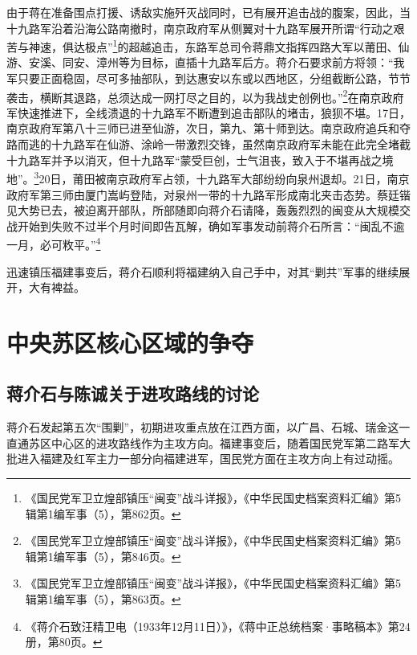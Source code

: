 由于蒋在准备围点打援、诱敌实施歼灭战同时，已有展开追击战的腹案，因此，当十九路军沿着沿海公路南撤时，南京政府军从侧翼对十九路军展开所谓“行动之艰苦与神速，俱达极点”\footnote{《国民党军卫立煌部镇压“闽变”战斗详报》，《中华民国史档案资料汇编》第5辑第1编军事（5），第862页。}的超越追击，东路军总司令蒋鼎文指挥四路大军以莆田、仙游、安溪、同安、漳州等为目标，直插十九路军后方。蒋介石要求前方将领：“我军只要正面稳固，尽可多抽部队，到达惠安以东或以西地区，分组截断公路，节节袭击，横断其退路，总须达成一网打尽之目的，以为我战史创例也。”\footnote{《国民党军卫立煌部镇压“闽变”战斗详报》，《中华民国史档案资料汇编》第5辑第1编军事（5），第846页。}在南京政府军快速推进下，全线溃退的十九路军不断遭到追击部队的堵击，狼狈不堪。17日，南京政府军第八十三师已进至仙游，次日，第九、第十师到达。南京政府追兵和夺路而逃的十九路军在仙游、涂岭一带激烈交锋，虽然南京政府军未能在此完全堵截十九路军并予以消灭，但十九路军“蒙受巨创，士气沮丧，致入于不堪再战之境地”。\footnote{《国民党军卫立煌部镇压“闽变”战斗详报》，《中华民国史档案资料汇编》第5辑第1编军事（5），第863页。}20日，莆田被南京政府军占领，十九路军大部纷纷向泉州退却。21日，南京政府军第三师由厦门嵩屿登陆，对泉州一带的十九路军形成南北夹击态势。蔡廷锴见大势已去，被迫离开部队，所部随即向蒋介石请降，轰轰烈烈的闽变从大规模交战开始到失败不过半个月时间即告瓦解，确如军事发动前蒋介石所言：“闽乱不逾一月，必可敉平。”\footnote{《蒋介石致汪精卫电（1933年12月11日）》，《蒋中正总统档案·事略稿本》第24册，第80页。}


迅速镇压福建事变后，蒋介石顺利将福建纳入自己手中，对其“剿共”军事的继续展开，大有裨益。

\section{中央苏区核心区域的争夺}

\subsection{蒋介石与陈诚关于进攻路线的讨论}


蒋介石发起第五次“围剿”，初期进攻重点放在江西方面，以广昌、石城、瑞金这一直通苏区中心区的进攻路线作为主攻方向。福建事变后，随着国民党军第二路军大批进入福建及红军主力一部分向福建进军，国民党方面在主攻方向上有过动摇。


